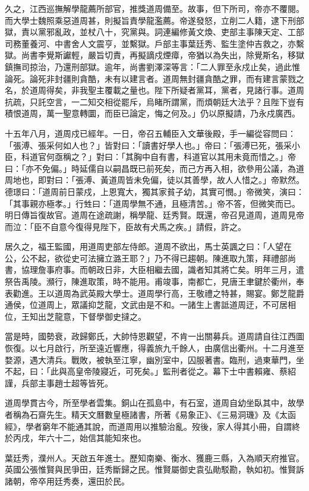 \begin{pinyinscope}
久之，江西巡撫解學龍薦所部官，推獎道周備至。故事，但下所司，帝亦不覆閱。而大學士魏照乘惡道周甚，則擬旨責學龍濫薦。帝遂發怒，立削二人籍，逮下刑部獄，責以黨邪亂政，並杖八十，究黨與。詞連編修黃文煥、吏部主事陳天定、工部司務董養河、中書舍人文震亨，並繫獄。戶部主事葉廷秀、監生塗仲吉救之，亦繫獄。尚書李覺斯讞輕，嚴旨切責，再擬謫戍煙瘴，帝猶以為失出，除覺斯名，移獄鎮撫司掠治，乃還刑部獄。逾年，尚書劉澤深等言：「二人罪至永戍止矣，過此惟論死。論死非封疆則貪酷，未有以建言者。道周無封疆貪酷之罪，而有建言蒙戮之名，於道周得矣，非我聖主覆載之量也。陛下所疑者黨耳，黨者，見諸行事。道周抗疏，只託空言，一二知交相從罷斥，烏睹所謂黨，而煩朝廷大法乎？且陛下豈有積恨道周，萬一聖意轉圜，而臣已論定，悔之何及。」仍以原擬請，乃永戍廣西。

十五年八月，道周戍已經年。一日，帝召五輔臣入文華後殿，手一編從容問曰：「張溥、張采何如人也？」皆對曰：「讀書好學人也。」帝曰：「張溥已死，張采小臣，科道官何亟稱之？」對曰：「其胸中自有書，科道官以其用未竟而惜之。」帝曰：「亦不免偏。」時延儒自以嗣昌既已前死矣，而己方再入相，欲參用公議，為道周地也，即對曰：「張溥、黃道周皆未免偏，徒以其善學，故人人惜之。」帝默然。德璟曰：「道周前日蒙戍，上恩寬大，獨其家貧子幼，其實可憫。」帝微笑，演曰：「其事親亦極孝。」行甡曰：「道周學無不通，且極清苦。」帝不答，但微笑而已。明日傳旨復故官。道周在途疏謝，稱學龍、廷秀賢。既還，帝召見道周，道周見帝而泣：「臣不自意今復得見陛下，臣故有犬馬之疾。」請假，許之。

居久之，福王監國，用道周吏部左侍郎。道周不欲出，馬士英諷之曰：「人望在公，公不起，欲從史可法擁立潞王耶？」乃不得已趨朝。陳進取九策，拜禮部尚書，協理詹事府事。而朝政日非，大臣相繼去國，識者知其將亡矣。明年三月，遣祭告禹陵。瀕行，陳進取策，時不能用。甫竣事，南都亡，見唐王聿鍵於衢州，奉表勸進。王以道周為武英殿大學士。道周學行高，王敬禮之特甚，賜宴。鄭芝龍爵通侯，位道周上，眾議抑芝龍，文武由是不和。一諸生上書詆道周迂，不可居相位，王知出芝龍意，下督學御史撻之。

當是時，國勢衰，政歸鄭氏，大帥恃恩觀望，不肯一出關募兵。道周請自往江西圖恢復。以七月啟行，所至遠近響應，得義旅九千餘人，由廣信出衢州。十二月進至婺源，遇大清兵。戰敗，被執至江寧，幽別室中，囚服著書。臨刑，過東華門，坐不起，曰：「此與高皇帝陵寢近，可死矣。」監刑者從之。幕下士中書賴雍、蔡紹謹，兵部主事趙士超等皆死。

道周學貫古今，所至學者雲集。銅山在孤島中，有石室，道周自幼坐臥其中，故學者稱為石齋先生。精天文曆數皇極諸書，所著《易象正》、《三易洞璣》及《太函經》，學者窮年不能通其說，而道周用以推驗治亂。歿後，家人得其小冊，自謂終於丙戌，年六十二，始信其能知來也。

葉廷秀，濮州人。天啟五年進士。歷知南樂、衡水、獲鹿三縣，入為順天府推官。英國公張惟賢與民爭田，廷秀斷歸之民。惟賢屬御史袁弘勛駁勘，執如初。惟賢訴諸朝，帝卒用廷秀奏，還田於民。


\end{pinyinscope}

